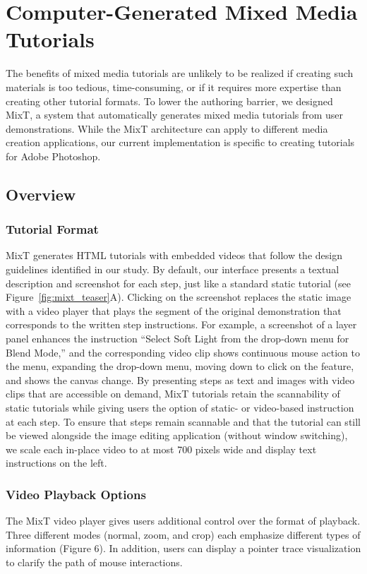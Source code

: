 \section{Computer-Generated Mixed Media Tutorials}

The benefits of mixed media tutorials are unlikely to be realized if creating such materials is too tedious, time-consuming, or if it requires more expertise than creating other tutorial formats. To lower the authoring barrier, we designed MixT, a system that automatically generates mixed media tutorials from user demonstrations. While the MixT architecture can apply to different media creation applications, our current implementation is specific to creating tutorials for Adobe Photoshop.

\subsection{Overview}
\subsubsection{Tutorial Format}
MixT generates HTML tutorials with embedded videos that follow the design guidelines identified in our study. By default, our interface presents a textual description and screenshot for each step, just like a standard static tutorial (see Figure~\ref{fig:mixt_teaser}A). Clicking on the screenshot replaces the static image with a video player that plays the segment of the original demonstration that corresponds to the written step instructions. For example, a screenshot of a layer panel enhances the instruction “Select Soft Light from the drop-down menu for Blend Mode,” and the corresponding video clip shows continuous mouse action to the menu, expanding the drop-down menu, moving down to click on the feature, and shows the canvas change. By presenting steps as text and images with video clips that are accessible on demand, MixT tutorials retain the scannability of static tutorials while giving users the option of static- or video-based instruction at each step. To ensure that steps remain scannable and that the tutorial can still be viewed alongside the image editing application (without window switching), we scale each in-place video to at most 700 pixels wide and display text instructions on the left.

\subsubsection{Video Playback Options }
The MixT video player gives users additional control over the format of playback. Three different modes (normal, zoom, and crop) each emphasize different types of information (Figure 6). In addition, users can display a pointer trace visualization to clarify the path of mouse interactions.


